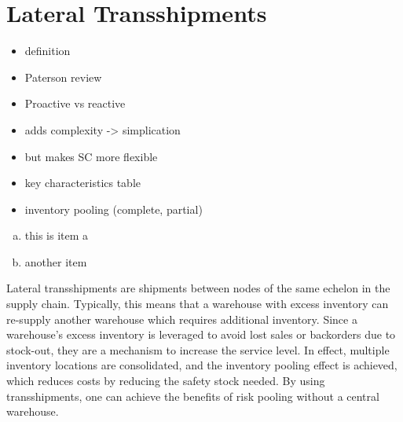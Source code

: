 \documentclass[../../main.tex]{subfiles}
\begin{document}

\newcommand{\headerline}[3]{%
  \par\medskip\noindent
  \makebox[0pt][l]{#1}%
  \makebox[\textwidth][c]{#2}%
  \makebox[0pt][r]{\texttt{#3}}\par\medskip}

\iffalse
\hspace*{\fill}
{ILLUSTRATION 1} \hfill {ILLUSTRATION 2}
\hspace*{\fill}
\fi

\iffalse
\begin{enumerate}[a)]
    \item \hfill$\begin{aligned}[t]
        &h_i + p_j - c_{ij} - (c_i - c_j) \geq 0
    \end{aligned}$\hfill\null
    \item \hfill$\begin{aligned}[t]
        &c_{ij} + (c_i - c_j) - (h_i - h_j) \geq 0
    \end{aligned}$\hfill\null
    \item \hfill$\begin{aligned}[t]
        &c_{ij} + (c_i - c_j) - (p_i - p_j) \geq 0
    \end{aligned}$\hfill\null
\end{enumerate}
\fi

\section{Lateral Transshipments}

\begin{itemize}
\item definition
\item Paterson review
\item Proactive vs reactive
\item adds complexity -> simplication
\item but makes SC more flexible
\item key characteristics table
\item inventory pooling (complete, partial)
\end{itemize}

\begin{enumerate}[a)]
\item this is item a
\item another item
\end{enumerate}

Lateral transshipments are shipments between nodes of the same echelon in the supply chain. Typically, this means that a warehouse with excess inventory can re-supply another warehouse which requires additional inventory. Since a warehouse's excess inventory is leveraged to avoid lost sales or backorders due to stock-out, they are a mechanism to increase the service level. In effect, multiple inventory locations are consolidated, and the inventory pooling effect is achieved, which reduces costs by reducing the safety stock needed. By using transshipments, one can achieve the benefits of risk pooling without a central warehouse. 
\end{document}
